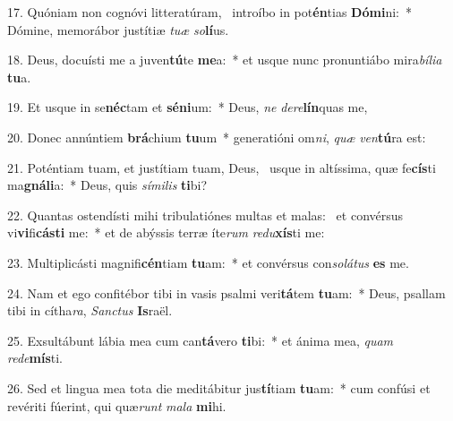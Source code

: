 17. Quóniam non cognóvi litteratúram, \dag\  introíbo in pot\textbf{én}tias \textbf{Dó}\textbf{mi}ni:~*  Dómine, memorábor justítiæ \textit{tu}\textit{æ} \textit{so}\textbf{lí}us.\

18. Deus, docuísti me a juven\textbf{tú}te \textbf{me}a:~*  et usque nunc pronuntiábo mira\textit{bí}\textit{li}\textit{a} \textbf{tu}a.\

19. Et usque in se\textbf{néc}tam et \textbf{sé}\textbf{ni}um:~*  Deus, \textit{ne} \textit{de}\textit{re}\textbf{lín}quas me,\

20. Donec annúntiem \textbf{brá}chium \textbf{tu}um~*  generatióni om\textit{ni}, \textit{quæ} \textit{ven}\textbf{tú}ra est:\

21. Poténtiam tuam, et justítiam tuam, Deus, \dag\  usque in altíssima, quæ fe\textbf{cís}ti ma\textbf{gná}\textbf{li}a:~*  Deus, quis \textit{sí}\textit{mi}\textit{lis} \textbf{ti}bi?\

22. Quantas ostendísti mihi tribulatiónes multas et malas: \dag\  et convérsus vi\textbf{vi}fi\textbf{cás}\textbf{ti} me:~*  et de abýssis terræ íte\textit{rum} \textit{re}\textit{du}\textbf{xís}ti me:\

23. Multiplicásti magnifi\textbf{cén}tiam \textbf{tu}am:~*  et convérsus con\textit{so}\textit{lá}\textit{tus} \textbf{es} me.\

24. Nam et ego confitébor tibi in vasis psalmi veri\textbf{tá}tem \textbf{tu}am:~*  Deus, psallam tibi in cítha\textit{ra}, \textit{Sanc}\textit{tus} \textbf{Is}raël.\

25. Exsultábunt lábia mea cum can\textbf{tá}vero \textbf{ti}bi:~*  et ánima mea, \textit{quam} \textit{red}\textit{e}\textbf{mís}ti.\

26. Sed et lingua mea tota die meditábitur jus\textbf{tí}tiam \textbf{tu}am:~*  cum confúsi et revériti fúerint, qui quæ\textit{runt} \textit{ma}\textit{la} \textbf{mi}hi.\

